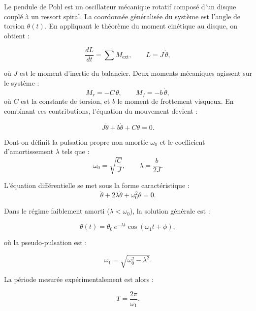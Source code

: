 Le pendule de Pohl est un oscillateur mécanique rotatif composé d'un disque couplé à un ressort
spiral. La coordonnée généralisée du système est l’angle de torsion $\theta(t)$.
En appliquant le théorème du moment cinétique au disque, on obtient :

\begin{equation}
\frac{dL}{dt} = \sum M_{\mathrm{ext}},
\qquad L = J\,\dot{\theta},
\label{eq:TMC}
\end{equation}

où $J$ est le moment d’inertie du balancier. Deux moments mécaniques agissent sur le système :
\begin{equation}
M_r = -C\,\theta,
\qquad
M_f = -b\,\dot{\theta},
\label{eq:MOMENTS}
\end{equation}
où $C$ est la constante de torsion, et $b$ le moment de frottement visqueux.  
En combinant ces contributions, l'équation du mouvement devient :

\begin{equation}
J\ddot{\theta} + b\dot{\theta} + C\theta = 0.
\label{eq:edo}
\end{equation}

Dont on définit la pulsation propre non amortie $\omega_0$ et le coefficient d'amortissement $\lambda$ tels que :
\begin{equation}
\omega_0 = \sqrt{\frac{C}{J}},
\qquad
\lambda = \frac{b}{2J}.
\label{eq:lambda} %
\end{equation}

L’équation différentielle se met sous la forme caractéristique :
\begin{equation}
\ddot{\theta} + 2\lambda \dot{\theta} + \omega_0^2 \theta = 0.
\label{eq:cara}
\end{equation}

Dans le régime faiblement amorti ($\lambda < \omega_0$), la solution générale est :

\begin{equation}
\theta(t) = \theta_0\,e^{-\lambda t}
\cos(\omega_1 t + \phi),
\label{eq:solution}
\end{equation}

où la pseudo-pulsation est :

\begin{equation}
\omega_1 = \sqrt{\omega_0^2 - \lambda^2}.
\label{eq:w}
\end{equation}

La période mesurée expérimentalement est alors :

\begin{equation}
T = \frac{2\pi}{\omega_1}.
\label{eq:t}
\end{equation}

